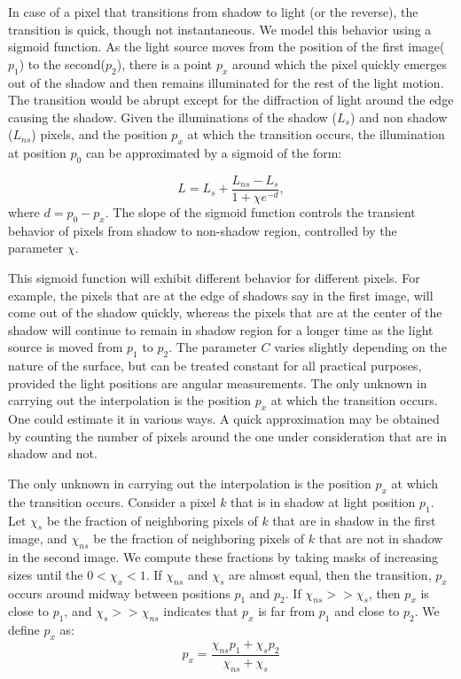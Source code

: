 In case of a pixel that transitions from shadow to light (or the reverse), the
transition is quick, though not instantaneous. We model this behavior using a
sigmoid function. As the light source moves from the position of the first
image($p_1$) to  the second($p_2$), there is a point $p_x$ around which the
pixel quickly emerges out of the shadow and then remains illuminated for the
rest of the light motion. The transition would be abrupt except for the
diffraction of light around the edge causing the shadow. Given the illuminations
of the shadow ($L_s$) and non shadow ($L_{ns}$) pixels, and the position $p_x$
at which the transition occurs, the illumination at position $p_0$ can be
approximated by a sigmoid of the form:


\begin{equation}
L = L_{s} + \frac{L_{ns} - L_{s}}{1 + \chi e^{-d}},
\end{equation}
where $d = p_0 - p_x$. The slope of the sigmoid function controls the transient
behavior of pixels from shadow to non-shadow region, controlled by the parameter
$\chi$.



This sigmoid function will exhibit different behavior for different pixels. For
example, the pixels that are at the edge of shadows say in the first image, will
come out of the shadow quickly, whereas the pixels that are at the center of the
shadow will continue to remain in shadow region for a longer time as the light
source is moved from $p_1$ to $p_2$. The parameter $C$ varies slightly depending
on the nature of the surface, but can be treated constant for all practical
purposes, provided the light positions are angular measurements. The only
unknown in carrying out the interpolation is the position $p_x$ at which the
transition occurs. One could estimate it in various ways. A quick approximation
may be obtained by counting the number of pixels around the one under
consideration that are in shadow and not.

The only
unknown in carrying out the interpolation is the position $p_x$ at which the
transition occurs.
Consider a pixel $k$ that is in shadow at light position $p_1$. Let $\chi_s$ be the
fraction of neighboring pixels of $k$ that are in shadow in the first image, and
$\chi_{ns}$ be the fraction of neighboring pixels of $k$ that are not in shadow in
the second image. We compute these fractions by taking masks of increasing sizes
until the $0 < \chi_x < 1$. If $\chi_{ns}$ and $\chi_{s}$ are almost equal, then the
transition, $p_x$ occurs around midway between positions $p_1$ and $p_2$. If
$\chi_{ns} >> \chi_{s}$, then $p_x$ is close to $p_1$, and $\chi_{s} >> \chi_{ns}$ indicates
that $p_x$ is far from $p_1$ and close to $p_2$. We define $p_x$ as: 
\begin{equation}
p_x = \frac{\chi_{ns} p_1 + \chi_s p_2}{\chi_{ns} + \chi_s}
\end{equation}

